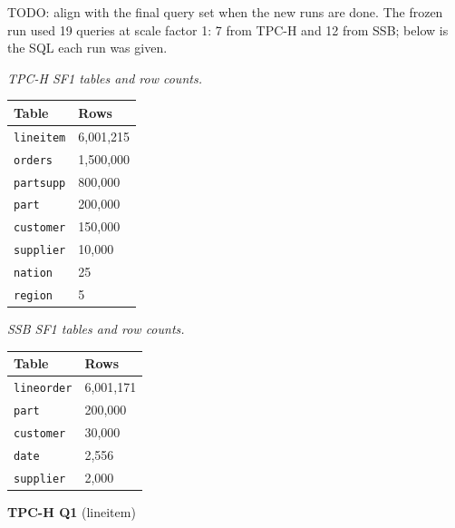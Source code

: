 \documentclass[
  10pt,
]{article}
\newcounter{none} %
\begin{document}
TODO: align with the final query set when the new runs are done. The
frozen run used 19 queries at scale factor 1: 7 from TPC-H and 12 from
SSB; below is the SQL each run was given.

\emph{TPC-H SF1 tables and row counts.}

{\def\LTcaptype{none} %
\begin{longtable}[]{@{}ll@{}}
\toprule\noalign{}
Table & Rows \\
\midrule\noalign{}
\endhead
\bottomrule\noalign{}
\endlastfoot
\texttt{lineitem} & 6,001,215 \\
\texttt{orders} & 1,500,000 \\
\texttt{partsupp} & 800,000 \\
\texttt{part} & 200,000 \\
\texttt{customer} & 150,000 \\
\texttt{supplier} & 10,000 \\
\texttt{nation} & 25 \\
\texttt{region} & 5 \\
\end{longtable}
}

\emph{SSB SF1 tables and row counts.}

{\def\LTcaptype{none} %
\begin{longtable}[]{@{}ll@{}}
\toprule\noalign{}
Table & Rows \\
\midrule\noalign{}
\endhead
\bottomrule\noalign{}
\endlastfoot
\texttt{lineorder} & 6,001,171 \\
\texttt{part} & 200,000 \\
\texttt{customer} & 30,000 \\
\texttt{date} & 2,556 \\
\texttt{supplier} & 2,000 \\
\end{longtable}
}

\textbf{TPC-H Q1} (lineitem)
\end{document}
